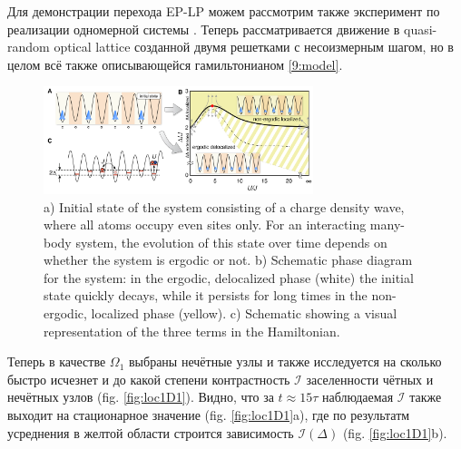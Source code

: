 Для демонстрации перехода EP-LP можем рассмотрим также эксперимент по реализации одномерной системы \cite{schreiber_observation_2015}. Теперь рассматривается движение в quasi-random optical lattice созданной двумя решетками с несоизмерным шагом, но в целом всё также описывающейся гамильтонианом \eqref{9:model}.



\begin{figure}
    \centering
    \includegraphics[width=0.7\textwidth]{imgs/1d_phases.png}
    \caption{\cite{schreiber_observation_2015} a) Initial state of the system consisting of a charge density wave, where all atoms occupy even sites only. For an interacting many-body system, the evolution of this state over time depends on whether the system is ergodic or not. b) Schematic phase diagram for the system: in the ergodic, delocalized phase (white) the initial state quickly decays, while it persists for long times in the non-ergodic, localized phase (yellow). c) Schematic showing a visual representation of the three terms in the Hamiltonian. }
    \label{fig:1Dmain}
\end{figure}




Теперь в качестве $\Omega_1$ выбраны нечётные узлы и также исследуется на сколько быстро исчезнет и до какой степени контрастность $\mathcal{I}$ заселенности чётных и нечётных узлов (fig. \ref{fig:loc1D1}). Видно, что за $t \approx 15 \tau$ наблюдаемая $\mathcal{I}$ также выходит на стационарное значение (fig. \ref{fig:loc1D1}a), где по результатм усреднения в желтой области строится зависимость $\mathcal{I}(\Delta)$ (fig. \ref{fig:loc1D1}b).

